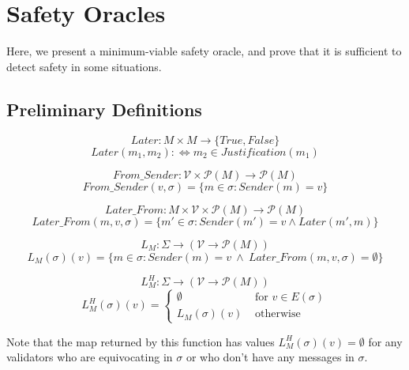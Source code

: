 \section{Safety Oracles}
Here, we present a minimum-viable safety oracle, and prove that it is sufficient to detect safety in some situations.

\subsection{Preliminary Definitions}

\begin{defn}[Later]
$$
Later:M \times M \to \{True, False\}
$$
$$
Later(m_1, m_2) :\Leftrightarrow m_2 \in Justification(m_1)
$$
\end{defn}


\begin{defn}
$$
From\_Sender: \mathcal{V} \times \mathcal{P}(M) \to \mathcal{P}(M)
$$
$$
From\_Sender(v, \sigma) = \{m \in \sigma : Sender(m) = v\}
$$
\end{defn}

\begin{defn}
$$
Later\_From: M \times \mathcal{V} \times \mathcal{P}(M) \to \mathcal{P}(M)
$$
$$
Later\_From(m, v, \sigma) = \{m' \in \sigma : Sender(m') = v \land Later(m', m)\}
$$
\end{defn}

\begin{defn}
$$
L_M:\Sigma \to (\mathcal{V} \to \mathcal{P}(M))
$$
$$
L_M(\sigma)(v) = \{m \in \sigma : Sender(m) = v ~\land~ Later\_From(m,v,\sigma) = \emptyset\}
$$
\end{defn}


\begin{defn}
$$
L^H_M:\Sigma \to (\mathcal{V} \to \mathcal{P}(M))
$$
\[ L^H_M(\sigma)(v) = \left\{
\begin{array}{ll}
      \emptyset& \text{ for } v \in E(\sigma) \\
      L_M(\sigma)(v)& \text{ otherwise }
\end{array}
\right. \]
\end{defn}

Note that the map returned by this function has values $L^H_M(\sigma)(v) = \emptyset$ for any validators who are equivocating in $\sigma$ or who don't have any messages in $\sigma$.

